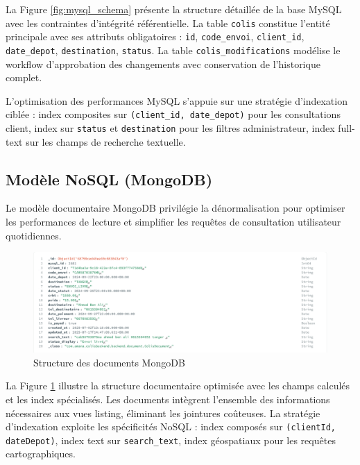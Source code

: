 La Figure \ref{fig:mysql_schema} présente la structure détaillée de la base MySQL avec les contraintes d'intégrité référentielle. La table \texttt{colis} constitue l'entité principale avec ses attributs obligatoires : \texttt{id}, \texttt{code\_envoi}, \texttt{client\_id}, \texttt{date\_depot}, \texttt{destination}, \texttt{status}. La table \texttt{colis\_modifications} modélise le workflow d'approbation des changements avec conservation de l'historique complet.

L'optimisation des performances MySQL s'appuie sur une stratégie d'indexation ciblée : index composites sur \texttt{(client\_id, date\_depot)} pour les consultations client, index sur \texttt{status} et \texttt{destination} pour les filtres administrateur, index full-text sur les champs de recherche textuelle.

\subsection{Modèle NoSQL (MongoDB)}

Le modèle documentaire MongoDB privilégie la dénormalisation pour optimiser les performances de lecture et simplifier les requêtes de consultation utilisateur quotidiennes.

\begin{figure}[H]
\centering
\includegraphics[width=1.3\textwidth]{images/mongodb_document.png}
\caption{Structure des documents MongoDB}
\label{fig:mongodb_document}
\end{figure}

La Figure \ref{fig:mongodb_document} illustre la structure documentaire optimisée avec les champs calculés et les index spécialisés. Les documents intègrent l'ensemble des informations nécessaires aux vues listing, éliminant les jointures coûteuses. La stratégie d'indexation exploite les spécificités NoSQL : index composés sur \texttt{(clientId, dateDepot)}, index text sur \texttt{search\_text}, index géospatiaux pour les requêtes cartographiques.
